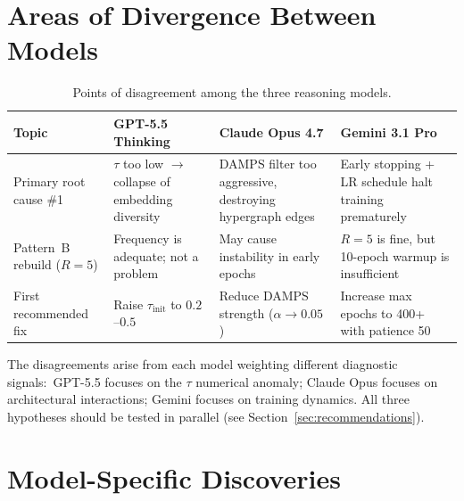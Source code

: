 \documentclass[12pt,a4paper]{article}
\begin{document}
\section{Areas of Divergence Between Models}

\begin{table}[htbp]
\centering
\caption{Points of disagreement among the three reasoning models.}
\label{tab:disagreement}
\begin{tabular}{|>{\raggedright\arraybackslash}p{3.0cm}|
                >{\raggedright\arraybackslash}p{3.5cm}|
                >{\raggedright\arraybackslash}p{3.5cm}|
                >{\raggedright\arraybackslash}p{3.5cm}|}
\hline
\rowcolor{tabhead}\textbf{Topic} & \textbf{GPT-5.5 Thinking} & \textbf{Claude Opus 4.7} & \textbf{Gemini 3.1 Pro} \\
\hline
Primary root cause \#1
  & $\tau$ too low $\to$ collapse of embedding diversity
  & DAMPS filter too aggressive, destroying hypergraph edges
  & Early stopping + LR schedule halt training prematurely \\\hline

Pattern~B rebuild ($R = 5$)
  & Frequency is adequate; not a problem
  & May cause instability in early epochs
  & $R = 5$ is fine, but 10-epoch warmup is insufficient \\\hline

First recommended fix
  & Raise $\tau_{\text{init}}$ to $0.2$--$0.5$
  & Reduce DAMPS strength ($\alpha \to 0.05$)
  & Increase max epochs to 400+ with patience 50 \\\hline
\end{tabular}
\end{table}

The disagreements arise from each model weighting different diagnostic
signals:\ GPT-5.5 focuses on the $\tau$ numerical anomaly; Claude Opus
focuses on architectural interactions; Gemini focuses on training dynamics.
All three hypotheses should be tested in parallel (see Section~\ref{sec:recommendations}).

\section{Model-Specific Discoveries}
\end{document}
